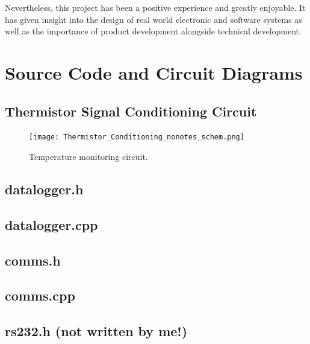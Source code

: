 \documentclass[a4paper,10pt]{article}  %
\begin{document}
Nevertheless, this project has been a positive experience and greatly
enjoyable. It has given insight into the design of real world
electronic and software systems as well as the importance of product
development alongside technical development.

\FloatBarrier
\appendix

\section{Source Code and Circuit Diagrams}
\label{sec:source-code-circuit}

\subsection{Thermistor Signal Conditioning Circuit}

\begin{figure}[h]
  \begin{center}
    \texttt{[image: Thermistor\_Conditioning\_nonotes\_schem.png]}
  \end{center}
  \caption{Temperature monitoring circuit.}
  \label{fig:tempcct}
\end{figure}

\subsection{datalogger.h}



\subsection{datalogger.cpp}



\subsection{comms.h}



\subsection{comms.cpp}



\subsection[rs232.h]{rs232.h (not written by me!)}
\end{document}

